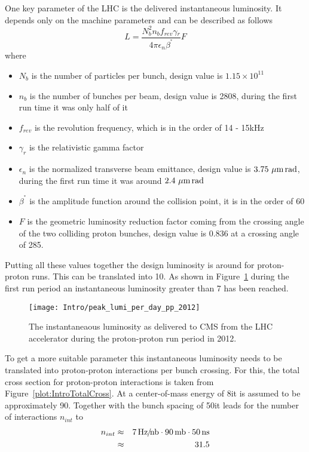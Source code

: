 One key parameter of the LHC is the delivered instantaneous luminosity. It depends only on the machine parameters and can be described as follows
\begin{equation}
L = \frac{N_{b}^{2}n_{b}f_{rev}\gamma{}_{r}}{4\pi\epsilon{}_{n}\beta^{^\ast}}F
\label{eq:Luminosity}
\end{equation}
where
\begin{itemize}
\item{$N_{b}$} is the number of particles per bunch, design value is $1.15 \times 10^{11}$
\item{$n_{b}$} is the number of bunches per beam, design value is 2808, during the first run time it was only half of it
\item{$f_{rev}$} is the revolution frequency, which is in the order of 14 - 15\unit{kHz}
\item{$\gamma_{r}$} is the relativistic gamma factor
\item{$\epsilon{}_{n}$} is the normalized transverse beam emittance, design value is $3.75\,\,\mu\text{m}{}\,\text{rad}$, during the first run time it was around $2.4\,\,\mu\text{m}{}\,\text{rad}$
\item{$\beta^{^\ast}$} is the amplitude function around the collision point, it is in the order of 60\cm{}
\item{$F$} is the geometric luminosity reduction factor coming from the crossing angle of the two colliding proton bunches, design value is 0.836 at a crossing angle of 285\murad{}.
\end{itemize}

Putting all these values together the design luminosity is around \LHigh{} for proton-proton runs. This can be translated into 10\hertzpernbarn{}. As shown in Figure~\ref{plot:IntroInstLumi} during the first run period an instantaneous luminosity greater than 7\hertzpernbarn{} has been reached.

\begin{figure}[!Hhtb]
  \centering
  \texttt{[image: Intro/peak\_lumi\_per\_day\_pp\_2012]}
  \caption[Instantaneous luminosity at CMS]{The instantaneaous luminosity as delivered to CMS from the LHC accelerator during the proton-proton run period in 2012. \label{plot:IntroInstLumi}}
\end{figure}

To get  a more suitable parameter this instantaneous luminosity needs to be translated into proton-proton interactions per bunch crossing. For this, the total cross section for proton-proton interactions is taken from Figure~\ref{plot:IntroTotalCross}. At a center-of-mass energy of 8\TeV it is assumed to be approximately 90\mb. Together with the bunch spacing of 50\ns it leads for the number of interactions $n_{int}$ to
\begin{eqnarray}
n_{int} & \approx & 7\, \text{Hz\hspace{-0.08em}/\hspace{-0.16em}}\text{nb} \cdot 90\,\text{mb} \cdot 50\,\text{ns} \nonumber \\
 & \approx & 31.5 \nonumber
\end{eqnarray}

